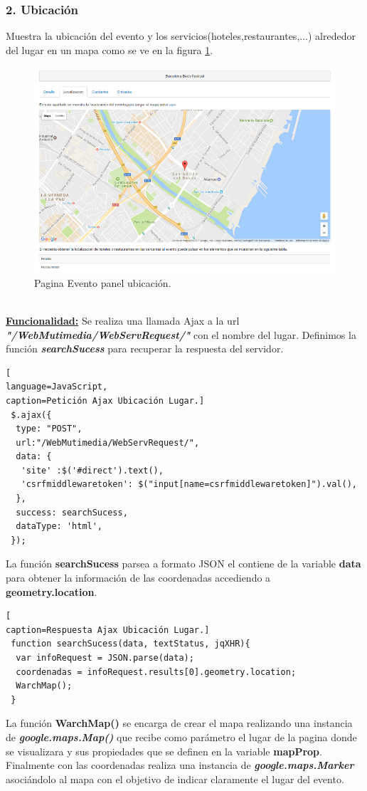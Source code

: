 \subsubsection*{2. Ubicación}
 Muestra la ubicación del evento y los servicios(hoteles,restaurantes,...) alrededor del lugar en un mapa como se ve en la figura \ref{fig:Ubicacion_Evento}.
\begin{figure}[!h]
\begin{center}
   \includegraphics[width=0.6\linewidth]{Figures/Ubicacion_Evento}
  \decoRule
  \caption[ Evento panel ubicación]{Pagina Evento panel ubicación.}
\label{fig:Ubicacion_Evento}
\end{center}
\end{figure}
\\\underline{\textbf{Funcionalidad:}} Se realiza una llamada Ajax a la url \textit{\textbf{ "/WebMutimedia/WebServRequest/"}} con el nombre del lugar. Definimos la función \textit{\textbf{searchSucess}} para recuperar la respuesta del servidor.
\begin{lstlisting}[
language=JavaScript,
caption=Petición Ajax Ubicación Lugar.]
 $.ajax({ 
  type: "POST",
  url:"/WebMutimedia/WebServRequest/",
  data: {
   'site' :$('#direct').text(),
   'csrfmiddlewaretoken': $("input[name=csrfmiddlewaretoken]").val(),
  },
  success: searchSucess,
  dataType: 'html',
 });
\end{lstlisting}
La función \textbf{searchSucess} parsea a formato JSON el contiene de la variable \textbf{data} para obtener la información de las coordenadas accediendo a \textbf{geometry.location}.
\begin{lstlisting}[
caption=Respuesta Ajax Ubicación Lugar.]  
 function searchSucess(data, textStatus, jqXHR){
  var infoRequest = JSON.parse(data);
  coordenadas = infoRequest.results[0].geometry.location;
  WarchMap();  
 }
\end{lstlisting}
La función \textbf{ WarchMap()} se encarga de crear el mapa realizando una instancia de \textit{\textbf{google.maps.Map()}} que recibe como parámetro el lugar de la pagina donde se visualizara y sus propiedades que se definen en la variable \textbf{mapProp}. Finalmente con las coordenadas realiza una instancia de \textit{\textbf{google.maps.Marker}} asociándolo al mapa con el objetivo de indicar claramente el lugar del evento.
